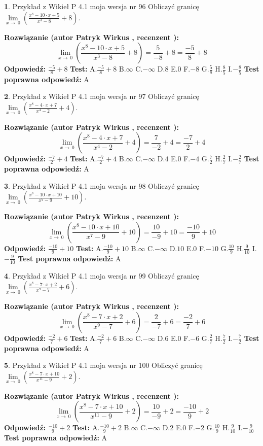 \documentclass[12pt, a4paper]{article}
\theoremstyle{definition} %
\newtheorem{zad}{}
\newcommand{\zadStart}[1]{\begin{zad}#1\newline}
\newcommand{\zadStop}{\end{zad}}
\newcommand{\rozwStart}[2]{\noindent \textbf{Rozwiązanie (autor #1 , recenzent #2): }\newline}
\newcommand{\rozwStop}{\newline}
\newcommand{\odpStart}{\noindent \textbf{Odpowiedź:}\newline}
\newcommand{\odpStop}{\newline}
\newcommand{\testStart}{\noindent \textbf{Test:}\newline}
\newcommand{\testStop}{\newline}
\newcommand{\kluczStart}{\noindent \textbf{Test poprawna odpowiedź:}\newline}
\newcommand{\kluczStop}{\newline}
\begin{document}
\zadStart{Przykład z Wikieł P 4.1 moja wersja nr 96}
Obliczyć granicę $\lim\limits_{x\to\ 0}(\frac{x^{8}-10 \cdot x +5}{x^{3}-8}+8)$.
\zadStop
\rozwStart{Patryk Wirkus}{}
$$\lim\limits_{x\to\ 0}(\frac{x^{8}-10 \cdot x +5}{x^{3}-8}+8)=\frac{5}{-8}+8=\frac{-5}{8}+8$$
\rozwStop
\odpStart
$\frac{-5}{8}+8$
\odpStop
\testStart
A.$\frac{-5}{8}+8$
B.$\infty$
C.$-\infty$
D.$8$
E.$0$
F.$-8$
G.$\frac{5}{8}$
H.$\frac{8}{5}$
I.$-\frac{8}{5}$
\testStop
\kluczStart
A
\kluczStop



\zadStart{Przykład z Wikieł P 4.1 moja wersja nr 97}
Obliczyć granicę $\lim\limits_{x\to\ 0}(\frac{x^{8}-4 \cdot x +7}{x^{4}-2}+4)$.
\zadStop
\rozwStart{Patryk Wirkus}{}
$$\lim\limits_{x\to\ 0}(\frac{x^{8}-4 \cdot x +7}{x^{4}-2}+4)=\frac{7}{-2}+4=\frac{-7}{2}+4$$
\rozwStop
\odpStart
$\frac{-7}{2}+4$
\odpStop
\testStart
A.$\frac{-7}{2}+4$
B.$\infty$
C.$-\infty$
D.$4$
E.$0$
F.$-4$
G.$\frac{7}{2}$
H.$\frac{2}{7}$
I.$-\frac{2}{7}$
\testStop
\kluczStart
A
\kluczStop



\zadStart{Przykład z Wikieł P 4.1 moja wersja nr 98}
Obliczyć granicę $\lim\limits_{x\to\ 0}(\frac{x^{8}-10 \cdot x +10}{x^{7}-9}+10)$.
\zadStop
\rozwStart{Patryk Wirkus}{}
$$\lim\limits_{x\to\ 0}(\frac{x^{8}-10 \cdot x +10}{x^{7}-9}+10)=\frac{10}{-9}+10=\frac{-10}{9}+10$$
\rozwStop
\odpStart
$\frac{-10}{9}+10$
\odpStop
\testStart
A.$\frac{-10}{9}+10$
B.$\infty$
C.$-\infty$
D.$10$
E.$0$
F.$-10$
G.$\frac{10}{9}$
H.$\frac{9}{10}$
I.$-\frac{9}{10}$
\testStop
\kluczStart
A
\kluczStop



\zadStart{Przykład z Wikieł P 4.1 moja wersja nr 99}
Obliczyć granicę $\lim\limits_{x\to\ 0}(\frac{x^{8}-7 \cdot x +2}{x^{9}-7}+6)$.
\zadStop
\rozwStart{Patryk Wirkus}{}
$$\lim\limits_{x\to\ 0}(\frac{x^{8}-7 \cdot x +2}{x^{9}-7}+6)=\frac{2}{-7}+6=\frac{-2}{7}+6$$
\rozwStop
\odpStart
$\frac{-2}{7}+6$
\odpStop
\testStart
A.$\frac{-2}{7}+6$
B.$\infty$
C.$-\infty$
D.$6$
E.$0$
F.$-6$
G.$\frac{2}{7}$
H.$\frac{7}{2}$
I.$-\frac{7}{2}$
\testStop
\kluczStart
A
\kluczStop



\zadStart{Przykład z Wikieł P 4.1 moja wersja nr 100}
Obliczyć granicę $\lim\limits_{x\to\ 0}(\frac{x^{8}-7 \cdot x +10}{x^{11}-9}+2)$.
\zadStop
\rozwStart{Patryk Wirkus}{}
$$\lim\limits_{x\to\ 0}(\frac{x^{8}-7 \cdot x +10}{x^{11}-9}+2)=\frac{10}{-9}+2=\frac{-10}{9}+2$$
\rozwStop
\odpStart
$\frac{-10}{9}+2$
\odpStop
\testStart
A.$\frac{-10}{9}+2$
B.$\infty$
C.$-\infty$
D.$2$
E.$0$
F.$-2$
G.$\frac{10}{9}$
H.$\frac{9}{10}$
I.$-\frac{9}{10}$
\testStop
\kluczStart
A
\kluczStop
\end{document}
